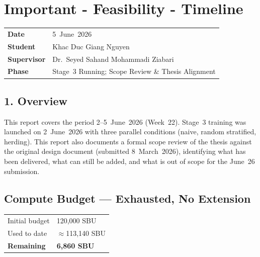 
\section*{Important - Feasibility - Timeline}

\begin{tabular}{ll}
    \textbf{Date}       & 5~June~2026 \\
    \textbf{Student}    & Khac Duc Giang Nguyen \\
    \textbf{Supervisor} & Dr.\ Seyed Sahand Mohammadi Ziabari \\
    \textbf{Phase}      & Stage~3 Running; Scope Review \& Thesis Alignment \\
\end{tabular}

\vspace{1em}

\subsection*{1. Overview}

This report covers the period 2--5~June~2026 (Week~22). Stage~3
training was launched on 2~June~2026 with three parallel conditions
(naive, random stratified, herding). This report also documents a
formal scope review of the thesis against the original design
document (submitted 8~March~2026), identifying what has been
delivered, what can still be added, and what is out of scope for
the June~26 submission.

\subsection*{Compute Budget — Exhausted, No Extension}

\begin{table}[h]
\centering
\small
\begin{tabular}{ll}
\hline
Initial budget      & 120,000 SBU \\
Used to date        & $\approx$113,140 SBU \\
\textbf{Remaining}  & \textbf{6,860 SBU} \\
\hline
\end{tabular}
\end{table}

